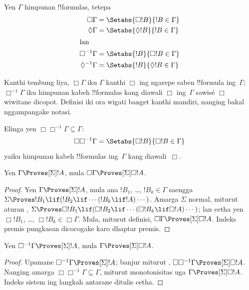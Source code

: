 \documentclass[../../../include/open-logic-section]{subfiles}
\begin{document}
\begin{defn}
  Yen $\Gamma$ himpunan !!{formula}s, tetepa
  \begin{align*}
    \Box\Gamma & = \Setabs{\Box !B}{!B \in \Gamma}\\
    \Diamond\Gamma & = \Setabs{\Diamond !B}{!B \in \Gamma}\\
    \intertext{lan}
    \Box^{-1}\Gamma & = \Setabs{!B}{\Box !B \in \Gamma}\\
    \Diamond^{-1}\Gamma & = \Setabs{!B}{\Diamond !B \in \Gamma}\\
  \end{align*}
\end{defn}

Kanthi tembung liya, $\Box\Gamma$ iku $\Gamma$ kanthi
$\Box$ ing ngarepe saben !!{formula} ing~$\Gamma$;
$\Box^{-1}\Gamma$ iku himpunan kabeh !!{formula}s kang diawali $\Box$
ing~$\Gamma$ sawisé $\Box$ wiwitane dicopot. Definisi iki
ora wigati banget kanthi mandiri, nanging bakal nggampangake notasi.

Elinga yen $\Box\Box^{-1}\Gamma \subseteq \Gamma$:
\[
\Box\Box^{-1}\Gamma = \Setabs{\Box!B}{\Box!B \in \Gamma}
\]
yaiku himpunan kabeh !!{formula}s ing~$\Gamma$ kang diawali~$\Box$.

\begin{lem}
  Yen $\Gamma \Proves[\Sigma] !A$, mula $\Box\Gamma \Proves[\Sigma] \Box
  !A$.
\end{lem}

\begin{proof}
  Yen $\Gamma \Proves[\Sigma] !A$, mula ana $!B_1$, \dots, $!B_k
  \in \Gamma$ saengga $\Sigma \Proves !B_1 \lif (!B_2 \lif \cdots
  (!B_k \lif !A)\cdots)$. Amarga $\Sigma$ normal, miturut aturan \RK{},
  $\Sigma \Proves \Box!B_1 \lif (\Box!B_2 \lif \cdots (\Box!B_k \lif
  \Box!A)\cdots)$; lan cetha yen $\Box!B_1$, \dots, $\Box!B_k \in
  \Box\Gamma$. Mula, miturut definisi, $\Box\Gamma \Proves[\Sigma] \Box
  !A$.
Indeks premis pungkasan dicocogake karo dhaptar premis.
\end{proof}

\begin{lem}
  Yen $\Box^{-1} \Gamma \Proves[\Sigma] !A$, mula $\Gamma
  \Proves[\Sigma] \Box!A$.
\end{lem}

\begin{proof}
  Upamane $\Box^{-1}\Gamma \Proves[\Sigma] !A$; banjur miturut
  , $\Box\Box^{-1}\Gamma \Proves[\Sigma] \Box!A$.
  Nanging amarga $\Box\Box^{-1}\Gamma \subseteq \Gamma$, miturut
  monotonisitas uga $\Gamma \Proves[\Sigma] \Box!A$.
Indeks sistem ing langkah antarane ditulis cetha.
\end{proof}
\end{document}
